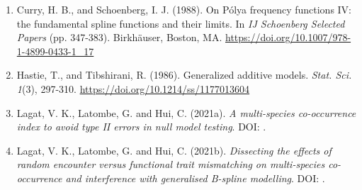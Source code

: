 \documentclass[a4paper]{book}
\begin{document}
%
\begin{References}\relax
\begin{enumerate}

\item{} Curry, H. B., and Schoenberg, I. J. (1988). On Pólya frequency functions IV: the
fundamental spline functions and their limits. In \emph{IJ Schoenberg Selected Papers}
(pp. 347-383). Birkhäuser, Boston, MA. \url{https://doi.org/10.1007/978-1-4899-0433-1_17}

\item{} Hastie, T., and Tibshirani, R. (1986). Generalized additive models. \emph{Stat. Sci. 1}(3),
297-310. \url{https://doi.org/10.1214/ss/1177013604}

\item{} Lagat, V. K., Latombe, G. and Hui, C. (2021a). \emph{A multi-species co-occurrence
index to avoid type II errors in null model testing}. DOI: .

\item{} Lagat, V. K., Latombe, G. and Hui, C. (2021b). \emph{Dissecting the effects of random
encounter versus functional trait mismatching on multi-species co-occurrence and
interference with generalised B-spline modelling}. DOI: .

\end{enumerate}

\end{References}
%
\end{document}
